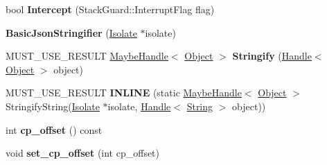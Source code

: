 \begin{DoxyCompactItemize}
\item 
\hypertarget{classv8_1_1internal_1_1_b_a_s_e___e_m_b_e_d_d_e_d_a62647187b79952d9ce23c2abdaf280db}{}bool {\bfseries Intercept} (Stack\+Guard\+::\+Interrupt\+Flag flag)\label{classv8_1_1internal_1_1_b_a_s_e___e_m_b_e_d_d_e_d_a62647187b79952d9ce23c2abdaf280db}

\item 
\hypertarget{classv8_1_1internal_1_1_b_a_s_e___e_m_b_e_d_d_e_d_af322579aaf94c57bab280d32e452e7e9}{}{\bfseries Basic\+Json\+Stringifier} (\hyperlink{classv8_1_1internal_1_1_isolate}{Isolate} $\ast$isolate)\label{classv8_1_1internal_1_1_b_a_s_e___e_m_b_e_d_d_e_d_af322579aaf94c57bab280d32e452e7e9}

\item 
\hypertarget{classv8_1_1internal_1_1_b_a_s_e___e_m_b_e_d_d_e_d_a522095c096a6597a920a3064b99abb99}{}M\+U\+S\+T\+\_\+\+U\+S\+E\+\_\+\+R\+E\+S\+U\+L\+T \hyperlink{classv8_1_1internal_1_1_maybe_handle}{Maybe\+Handle}$<$ \hyperlink{classv8_1_1internal_1_1_object}{Object} $>$ {\bfseries Stringify} (\hyperlink{classv8_1_1internal_1_1_handle}{Handle}$<$ \hyperlink{classv8_1_1internal_1_1_object}{Object} $>$ object)\label{classv8_1_1internal_1_1_b_a_s_e___e_m_b_e_d_d_e_d_a522095c096a6597a920a3064b99abb99}

\item 
\hypertarget{classv8_1_1internal_1_1_b_a_s_e___e_m_b_e_d_d_e_d_af2ee61c84a0bbbeac24f3cbaf8147a6f}{}M\+U\+S\+T\+\_\+\+U\+S\+E\+\_\+\+R\+E\+S\+U\+L\+T {\bfseries I\+N\+L\+I\+N\+E} (static \hyperlink{classv8_1_1internal_1_1_maybe_handle}{Maybe\+Handle}$<$ \hyperlink{classv8_1_1internal_1_1_object}{Object} $>$ Stringify\+String(\hyperlink{classv8_1_1internal_1_1_isolate}{Isolate} $\ast$isolate, \hyperlink{classv8_1_1internal_1_1_handle}{Handle}$<$ \hyperlink{classv8_1_1internal_1_1_string}{String} $>$ object))\label{classv8_1_1internal_1_1_b_a_s_e___e_m_b_e_d_d_e_d_af2ee61c84a0bbbeac24f3cbaf8147a6f}

\item 
\hypertarget{classv8_1_1internal_1_1_b_a_s_e___e_m_b_e_d_d_e_d_a0add067d0c2da26b9c023b7ed1bff204}{}int {\bfseries cp\+\_\+offset} () const \label{classv8_1_1internal_1_1_b_a_s_e___e_m_b_e_d_d_e_d_a0add067d0c2da26b9c023b7ed1bff204}

\item 
\hypertarget{classv8_1_1internal_1_1_b_a_s_e___e_m_b_e_d_d_e_d_ade167046e00128d347b64f219c9fb61e}{}void {\bfseries set\+\_\+cp\+\_\+offset} (int cp\+\_\+offset)\label{classv8_1_1internal_1_1_b_a_s_e___e_m_b_e_d_d_e_d_ade167046e00128d347b64f219c9fb61e}


\end{DoxyCompactItemize}
